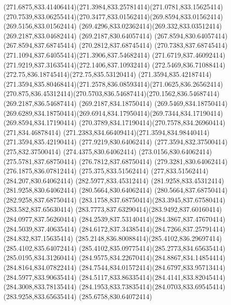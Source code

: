 {{	\curveto(271.6875,833.41406414)(271.3984,833.25781414)(271.0781,833.15625414)
	\curveto(270.7539,833.06255414)(270.3477,833.01562414)(269.8594,833.01562414)
	\lineto(269.5156,833.01562414)
	\curveto(269.4296,833.02362414)(269.332,833.03512414)(269.2187,833.04682414)
	\lineto(269.2187,830.64057414)
	\lineto(267.8594,830.64057414)
	\lineto(267.8594,837.68745414)
	\lineto(270.2812,837.68745414)
	\curveto(270.7383,837.68745414)(271.1094,837.64055414)(271.3906,837.54682414)
	\curveto(271.6719,837.46092414)(271.9219,837.31635414)(272.1406,837.10932414)
	\curveto(272.5469,836.71088414)(272.75,836.18745414)(272.75,835.53120414)
	\closepath
	\moveto(271.3594,835.42187414)
	\curveto(271.3594,835.80468414)(271.2578,836.08593414)(271.0625,836.26562414)
	\curveto(270.875,836.45312414)(270.5703,836.54687414)(270.1562,836.54687414)
	\lineto(269.2187,836.54687414)
	\lineto(269.2187,834.18750414)
	\lineto(269.5469,834.18750414)
	\curveto(269.6289,834.18750414)(269.6914,834.17950414)(269.7344,834.17190414)
	\lineto(269.8594,834.17190414)
	\curveto(270.3789,834.17190414)(270.7578,834.26960414)(271,834.46878414)
	\curveto(271.2383,834.66409414)(271.3594,834.98440414)(271.3594,835.42190414)
	\closepath
	\moveto(277.9219,830.64062414)
	\lineto(277.3594,832.37500414)
	\lineto(275,832.37500414)
	\lineto(274.4375,830.64062414)
	\lineto(273.0156,830.64062414)
	\lineto(275.5781,837.68750414)
	\lineto(276.7812,837.68750414)
	\lineto(279.3281,830.64062414)
	\closepath
	\moveto(276.1875,836.07812414)
	\lineto(275.375,833.51562414)
	\lineto(277,833.51562414)
	\closepath
	\moveto(284.207,830.64062414)
	\lineto(282.5977,833.45312414)
	\lineto(281.9258,833.45312414)
	\lineto(281.9258,830.64062414)
	\lineto(280.5664,830.64062414)
	\lineto(280.5664,837.68750414)
	\lineto(282.9258,837.68750414)
	\curveto(283.1758,837.68750414)(283.3945,837.67580414)(283.582,837.65630414)
	\curveto(283.7773,837.63290414)(283.9492,837.60160414)(284.0977,837.56260414)
	\curveto(284.2539,837.53140414)(284.3867,837.47670414)(284.5039,837.40635414)
	\curveto(284.6172,837.34385414)(284.7266,837.25791414)(284.832,837.15635414)
	\curveto(285.2148,836.80088414)(285.4102,836.29697414)(285.4102,835.64072414)
	\curveto(285.4102,835.09775414)(285.2773,834.65635414)(285.0195,834.31260414)
	\curveto(284.9575,834.22670414)(284.8867,834.14854414)(284.8164,834.07822414)
	\curveto(284.7544,834.01572414)(284.6797,833.95713414)(284.5977,833.90635414)
	\curveto(284.5117,833.86335414)(284.4141,833.82045414)(284.3008,833.78135414)
	\curveto(284.1953,833.73835414)(284.0703,833.69545414)(283.9258,833.65635414)
	\lineto(285.6758,830.64072414)
}}
